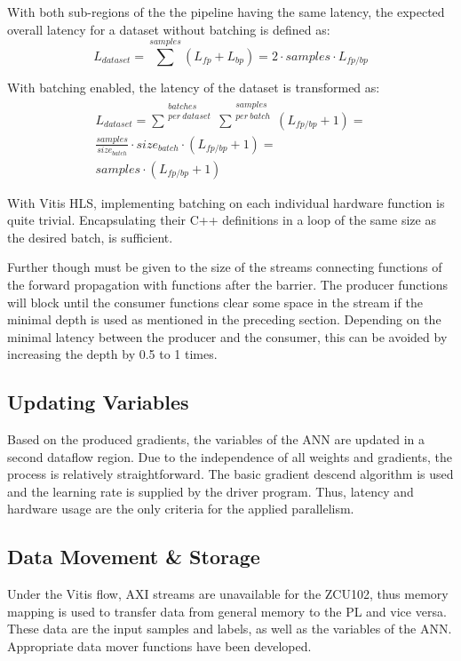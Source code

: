 With both sub-regions of the the pipeline having the same latency, the expected overall latency for a dataset without batching is defined as: %
\begin{equation}
L_{dataset} = \sum^{samples}( L_{fp} + L_{bp} ) = 2 \cdot samples \cdot L_{fp/bp}
	\label{eqn: latency dataset no batching}
\end{equation}

With batching enabled, the latency of the dataset is transformed as:
\begin{equation}
    \begin{gathered}
        L_{dataset} = \sum^{\substack{batches\\ per\ dataset}}\sum^{\substack{samples\\ per\ batch}}( L_{fp/bp} + 1 ) =\\
        \frac{samples}{size_{batch}} \cdot size_{batch} \cdot ( L_{fp/bp} + 1 ) =\\
        samples \cdot ( L_{fp/bp} + 1 )
    \end{gathered}
	\label{eqn: latency dataset with batching}
\end{equation}

With Vitis HLS, implementing batching on each individual hardware function is quite trivial. Encapsulating their C++ definitions in a loop of the same size as the desired batch, is sufficient. %

Further though must be given to the size of the streams connecting functions of the forward propagation with functions after the barrier. The producer functions will block until the consumer functions clear some space in the stream if the minimal depth is used as mentioned in the preceding section. Depending on the minimal latency between the producer and the consumer, this can be avoided by increasing the depth by 0.5 to 1 times.

\subsection{Updating Variables}
Based on the produced gradients, the variables of the ANN are updated in a second dataflow region. Due to the independence of all weights and gradients, the process is relatively straightforward. The basic gradient descend algorithm is used and the learning rate is supplied by the driver program. Thus, latency and hardware usage are the only criteria for the applied parallelism.

\subsection{Data Movement \& Storage}
Under the Vitis flow, AXI streams are unavailable for the ZCU102, thus memory mapping is used to transfer data from general memory to the PL and vice versa. These data are the input samples and labels, as well as the variables of the ANN. Appropriate data mover functions have been developed. %

